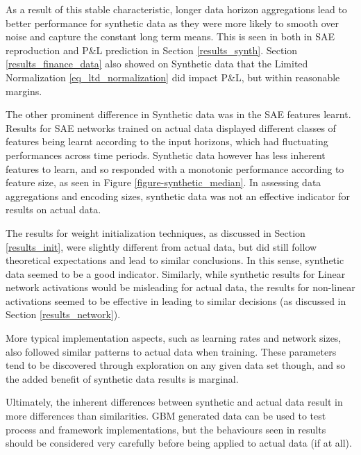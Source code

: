 \documentclass[a4paper,11pt,oneside]{article}
\theoremstyle{plain}
\theoremstyle{definition}
\begin{document}
		As a result of this stable characteristic, longer data horizon aggregations lead to better performance for synthetic data as they were more likely to smooth over noise and capture the constant long term means. This is seen in both in SAE reproduction and P\&L prediction in Section \ref{results_synth}. Section \ref{results_finance_data} also showed on Synthetic data that the Limited Normalization \eqref{eq_ltd_normalization} did impact P\&L, but within reasonable margins.\newline
	
		The other prominent difference in Synthetic data was in the SAE features learnt. Results for SAE networks trained on actual data displayed different classes of features being learnt according to the input horizons, which had fluctuating performances across time periods. Synthetic data however has less inherent features to learn, and so responded with a monotonic performance according to feature size, as seen in Figure \ref{figure-synthetic_median}. In assessing data aggregations and encoding sizes, synthetic data was not an effective indicator for results on actual data. \newline
	
		The results for weight initialization techniques, as discussed in Section \ref{results_init}, were slightly different from actual data, but did still follow theoretical expectations and lead to similar conclusions. In this sense, synthetic data seemed to be a good indicator. Similarly, while synthetic results for Linear network activations would be misleading for actual data, the results for non-linear activations seemed to be effective in leading to similar decisions (as discussed in Section \ref{results_network}).\newline
		
		More typical implementation aspects, such as learning rates and network sizes, also followed similar patterns to actual data when training. These parameters tend to be discovered through exploration on any given data set though, and so the added benefit of synthetic data results is marginal.\newline
		
		Ultimately, the inherent differences between synthetic and actual data result in more differences than similarities. GBM generated data can be used to test process and framework implementations, but the behaviours seen in results should be considered very carefully before being applied to actual data (if at all).
	
	
	
\end{document}
